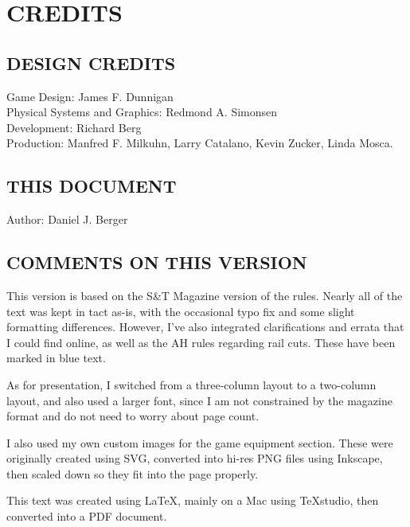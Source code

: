 \section{CREDITS}

\subsection{DESIGN CREDITS}

Game Design: James F. Dunnigan\\
Physical Systems and Graphics: Redmond A. Simonsen\\
Development: Richard Berg\\
Production: Manfred F. Milkuhn, Larry Catalano, Kevin Zucker, Linda Mosca.

\subsection{THIS DOCUMENT}

Author: Daniel J. Berger

\subsection{COMMENTS ON THIS VERSION}

This version is based on the S\&T Magazine version of the rules. Nearly all of the text was kept in tact as-is, with the occasional typo fix and some slight formatting differences. However, I've also integrated clarifications and errata that I could find online, as well as the AH rules regarding rail cuts. These have been marked in blue text.

As for presentation, I switched from a three-column layout to a two-column layout, and also used a larger font, since I am not constrained by the magazine format and do not need to worry about page count.

I also used my own custom images for the game equipment section. These were originally created using SVG, converted into hi-res PNG files using Inkscape, then scaled down so they fit into the page properly.

This text was created using LaTeX, mainly on a Mac using TeXstudio, then converted into a PDF document.